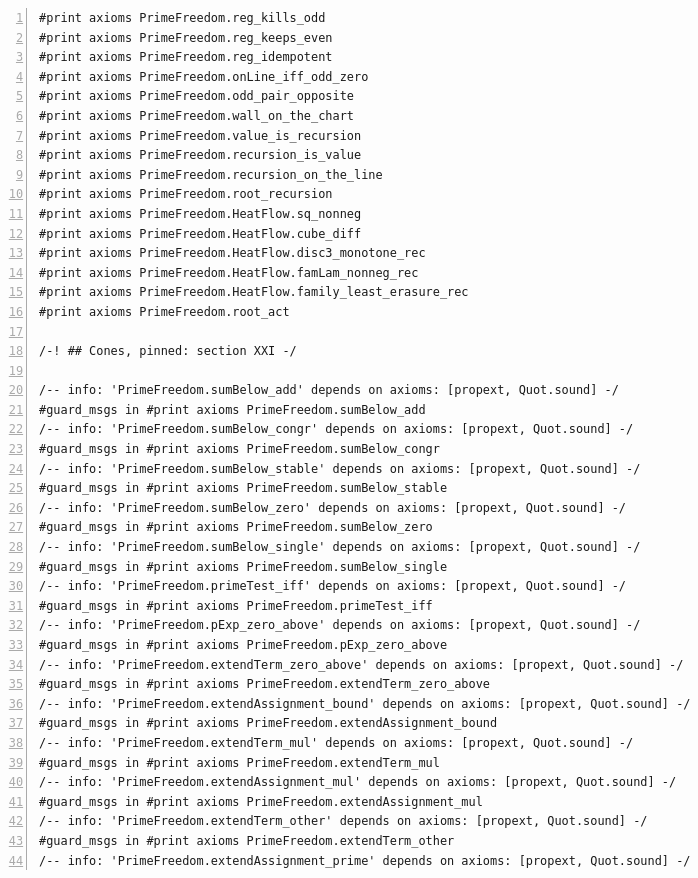 \documentclass[10pt]{article}
\newcommand{\leansize}{\fontsize{5.5pt}{6.75pt}\selectfont}
\begin{document}
\begin{multicols}{2}
\begin{Verbatim}[numbers=left,firstnumber=1,numbersep=3pt,xleftmargin=2.6em,breaklines=true,breakanywhere=true,breakautoindent=false,breakindent=1.4em,breaksymbolleft={},breakanywheresymbolpre={},fontsize=\leansize]
#print axioms PrimeFreedom.reg_kills_odd
#print axioms PrimeFreedom.reg_keeps_even
#print axioms PrimeFreedom.reg_idempotent
#print axioms PrimeFreedom.onLine_iff_odd_zero
#print axioms PrimeFreedom.odd_pair_opposite
#print axioms PrimeFreedom.wall_on_the_chart
#print axioms PrimeFreedom.value_is_recursion
#print axioms PrimeFreedom.recursion_is_value
#print axioms PrimeFreedom.recursion_on_the_line
#print axioms PrimeFreedom.root_recursion
#print axioms PrimeFreedom.HeatFlow.sq_nonneg
#print axioms PrimeFreedom.HeatFlow.cube_diff
#print axioms PrimeFreedom.HeatFlow.disc3_monotone_rec
#print axioms PrimeFreedom.HeatFlow.famLam_nonneg_rec
#print axioms PrimeFreedom.HeatFlow.family_least_erasure_rec
#print axioms PrimeFreedom.root_act

/-! ## Cones, pinned: section XXI -/

/-- info: 'PrimeFreedom.sumBelow_add' depends on axioms: [propext, Quot.sound] -/
#guard_msgs in #print axioms PrimeFreedom.sumBelow_add
/-- info: 'PrimeFreedom.sumBelow_congr' depends on axioms: [propext, Quot.sound] -/
#guard_msgs in #print axioms PrimeFreedom.sumBelow_congr
/-- info: 'PrimeFreedom.sumBelow_stable' depends on axioms: [propext, Quot.sound] -/
#guard_msgs in #print axioms PrimeFreedom.sumBelow_stable
/-- info: 'PrimeFreedom.sumBelow_zero' depends on axioms: [propext, Quot.sound] -/
#guard_msgs in #print axioms PrimeFreedom.sumBelow_zero
/-- info: 'PrimeFreedom.sumBelow_single' depends on axioms: [propext, Quot.sound] -/
#guard_msgs in #print axioms PrimeFreedom.sumBelow_single
/-- info: 'PrimeFreedom.primeTest_iff' depends on axioms: [propext, Quot.sound] -/
#guard_msgs in #print axioms PrimeFreedom.primeTest_iff
/-- info: 'PrimeFreedom.pExp_zero_above' depends on axioms: [propext, Quot.sound] -/
#guard_msgs in #print axioms PrimeFreedom.pExp_zero_above
/-- info: 'PrimeFreedom.extendTerm_zero_above' depends on axioms: [propext, Quot.sound] -/
#guard_msgs in #print axioms PrimeFreedom.extendTerm_zero_above
/-- info: 'PrimeFreedom.extendAssignment_bound' depends on axioms: [propext, Quot.sound] -/
#guard_msgs in #print axioms PrimeFreedom.extendAssignment_bound
/-- info: 'PrimeFreedom.extendTerm_mul' depends on axioms: [propext, Quot.sound] -/
#guard_msgs in #print axioms PrimeFreedom.extendTerm_mul
/-- info: 'PrimeFreedom.extendAssignment_mul' depends on axioms: [propext, Quot.sound] -/
#guard_msgs in #print axioms PrimeFreedom.extendAssignment_mul
/-- info: 'PrimeFreedom.extendTerm_other' depends on axioms: [propext, Quot.sound] -/
#guard_msgs in #print axioms PrimeFreedom.extendTerm_other
/-- info: 'PrimeFreedom.extendAssignment_prime' depends on axioms: [propext, Quot.sound] -/

\end{Verbatim}
\end{multicols}
\end{document}
